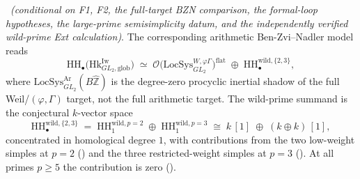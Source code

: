 \begin{theorem}
\label{v4-arith:bzn-rcompletion:thm:F3-BZN-Ar-corrected}
\ClaimStatusConjectured\ \emph{(conditional on F1, F2, the full-target
BZN comparison, the formal-loop hypotheses, the large-prime
semisimplicity datum, and the independently verified wild-prime Ext
calculation)}. The corresponding arithmetic Ben-Zvi--Nadler model
reads
\begin{equation}
\label{v4-arith:bzn-rcompletion:eq:F3-BZN-Ar-corrected}
\mathrm{HH}_{\bullet}\bigl(\mathrm{Hk}^{\mathrm{Iw}}_{GL_{2},\mathrm{glob}}\bigr)
\;\simeq\;
\mathcal{O}\bigl(\mathrm{LocSys}^{W,\varphi\Gamma}_{GL_{2}}\bigr)^{\mathrm{flat}}
\;\oplus\;\mathrm{HH}_{\bullet}^{\mathrm{wild},\{2,3\}},
\end{equation}
where \(\mathrm{LocSys}^{\mathrm{Ar}}_{GL_{2}}(B\widehat{\mathbb{Z}})\)
is the degree-zero procyclic inertial shadow of the full
Weil/\((\varphi,\Gamma)\) target, not the full arithmetic target.
The wild-prime summand is the conjectural
\(k\)-vector space
\begin{equation}
\label{v4-arith:bzn-rcompletion:eq:wild-summand}
\mathrm{HH}_{\bullet}^{\mathrm{wild},\{2,3\}}
\;=\;\mathrm{HH}_{1}^{\mathrm{wild},p=2}\;\oplus\;\mathrm{HH}_{1}^{\mathrm{wild},p=3}
\;\cong\;k\,[1]\;\oplus\;(k\oplus k)\,[1],
\end{equation}
concentrated in homological degree \(1\), with contributions from
the two low-weight simples at \(p=2\)
() and the three
restricted-weight simples at \(p=3\)
(). At all primes
\(p\geq 5\) the contribution is zero
().
\end{theorem}

